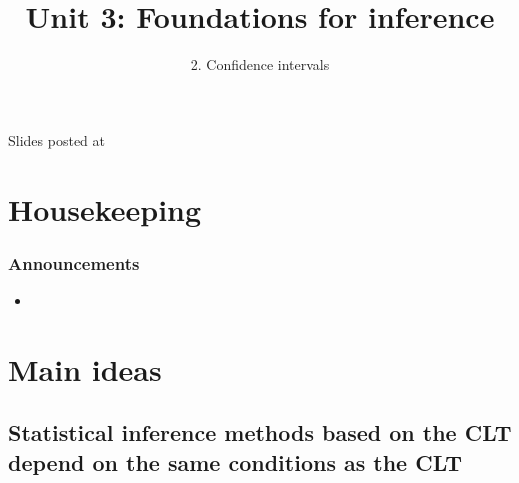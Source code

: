 \documentclass[11pt,containsverbatim,handout,xcolor=xelatex,dvipsnames,table]{beamer}
\title{Unit 3: Foundations for inference}
\subtitle{2. Confidence intervals}
\author{\CourseName}
\date{}
\institute{\InstituteName}
\begin{document}



\begin{frame}[plain]

\titlepage

\vfill

{\scriptsize {} \hfill Slides posted at  \webURL{\CourseSite}}

\addtocounter{framenumber}{-1} 

\end{frame}


\section{Housekeeping}


\begin{frame}
\frametitle{Announcements}

\begin{itemize}

\item 

\end{itemize}

\end{frame}


\section{Main ideas}

\subsection{Statistical inference methods based on the CLT depend on the same conditions as the CLT}
\label{mi1}

\end{document}
